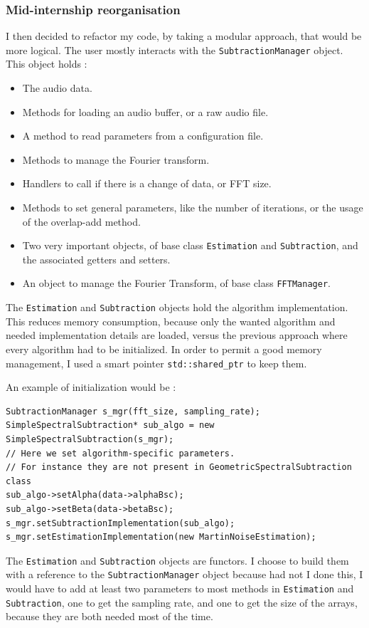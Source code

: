 \subsubsection{Mid-internship reorganisation}
I then decided to refactor my code, by taking a modular approach, that would be more logical.
The user mostly interacts with the \texttt{SubtractionManager} object. This object holds : 
\begin{itemize}
\item The audio data.
\item Methods for loading an audio buffer, or a raw audio file.
\item A method to read parameters from a configuration file.
\item Methods to manage the Fourier transform.
\item Handlers to call if there is a change of data, or FFT size.
\item Methods to set general parameters, like the number of iterations, or the usage of the overlap-add method.
\item Two very important objects, of base class \texttt{Estimation} and \texttt{Subtraction}, and the associated getters and setters.
\item An object to manage the Fourier Transform, of base class \texttt{FFTManager}.
\end{itemize}
The \texttt{Estimation} and \texttt{Subtraction} objects hold the algorithm implementation. This reduces memory consumption, because only the wanted algorithm and needed implementation details are loaded, versus the previous approach where every algorithm had to be initialized. In order to permit a good memory management, I used a  smart pointer \texttt{std::shared\_ptr} to keep them.

An example of initialization would be : 
\begin{lstlisting}[caption=Example initialization]
SubtractionManager s_mgr(fft_size, sampling_rate);
SimpleSpectralSubtraction* sub_algo = new SimpleSpectralSubtraction(s_mgr);
// Here we set algorithm-specific parameters.
// For instance they are not present in GeometricSpectralSubtraction class
sub_algo->setAlpha(data->alphaBsc); 
sub_algo->setBeta(data->betaBsc);
s_mgr.setSubtractionImplementation(sub_algo);
s_mgr.setEstimationImplementation(new MartinNoiseEstimation);
\end{lstlisting}

The \texttt{Estimation} and \texttt{Subtraction} objects are functors. I choose to build them with a reference to the \texttt{SubtractionManager} object because had not I done this, I would have to add at least two parameters to most methods in \texttt{Estimation} and \texttt{Subtraction}, one to get the sampling rate, and one to get the size of the arrays, because they are both needed most of the time.

